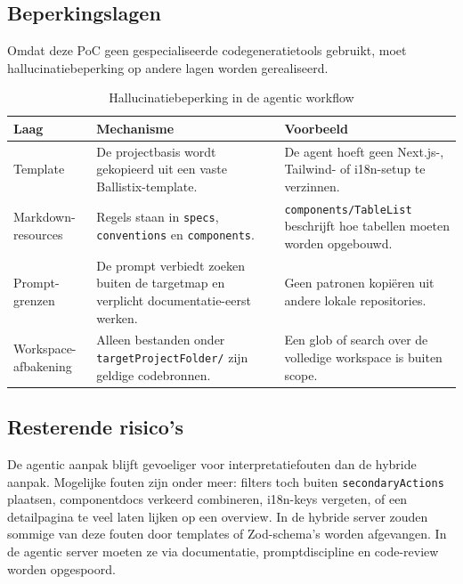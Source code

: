 \section{}
\label{sec:poc-agentic-hallucinatie}

\subsection{Beperkingslagen}

Omdat deze PoC geen gespecialiseerde codegeneratietools gebruikt, moet hallucinatiebeperking op andere lagen worden gerealiseerd.

\begin{table}[htbp]
  \centering
  \caption{Hallucinatiebeperking in de agentic workflow}
  \label{tab:poc-agentic-hallucination}
  \small
  \begin{tabularx}{\textwidth}{|l|X|X|}
    \hline
    \textbf{Laag} & \textbf{Mechanisme} & \textbf{Voorbeeld} \\
    \hline
    Template &
    De projectbasis wordt gekopieerd uit een vaste Ballistix-template. &
    De agent hoeft geen Next.js-, Tailwind- of i18n-setup te verzinnen. \\
    \hline
    Markdown-resources &
    Regels staan in \texttt{specs}, \texttt{conventions} en \texttt{components}. &
    \texttt{components/TableList} beschrijft hoe tabellen moeten worden opgebouwd. \\
    \hline
    Prompt-grenzen &
    De prompt verbiedt zoeken buiten de targetmap en verplicht documentatie-eerst werken. &
    Geen patronen kopiëren uit andere lokale repositories. \\
    \hline
    Workspace-afbakening &
    Alleen bestanden onder \texttt{targetProjectFolder/} zijn geldige codebronnen. &
    Een glob of search over de volledige workspace is buiten scope. \\
    \hline
  \end{tabularx}
\end{table}

\subsection{Resterende risico's}

De agentic aanpak blijft gevoeliger voor interpretatiefouten dan de hybride aanpak. Mogelijke fouten zijn onder meer: filters toch buiten \texttt{secondaryActions} plaatsen, componentdocs verkeerd combineren, i18n-keys vergeten, of een detailpagina te veel laten lijken op een overview. In de hybride server zouden sommige van deze fouten door templates of Zod-schema's worden afgevangen. In de agentic server moeten ze via documentatie, promptdiscipline en code-review worden opgespoord.

